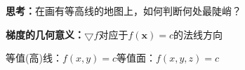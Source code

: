 {\bf 思考：}在画有等高线的地图上，如何判断何处最陡峭？

{\bf 梯度的几何意义：}$\bigtriangledown f$对应于$f(\bm{x})=c$的法线方向

\begin{center}
	\hspace{3cm}
	
	等值(高)线：$f(x,y)=c$\hspace{3cm}等值面：$f(x,y,z)=c$
\end{center}

